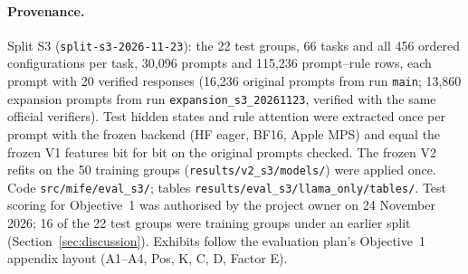 \documentclass{article}
\begin{document}
\paragraph{Provenance.} Split S3 (\texttt{split-s3-2026-11-23}): the 22 test groups, 66 tasks and all 456 ordered
configurations per task, 30,096 prompts and 115,236 prompt--rule rows, each prompt with 20 verified responses (16,236
original prompts from run \texttt{main}; 13,860 expansion prompts from run \texttt{expansion\_s3\_20261123}, verified
with the same official verifiers). Test hidden states and rule attention were extracted once per prompt with the frozen
backend (HF eager, BF16, Apple MPS) and equal the frozen V1 features bit for bit on the original prompts checked. The
frozen V2 refits on the 50 training groups (\texttt{results/v2\_s3/models/}) were applied once. Code
\texttt{src/mife/eval\_s3/}; tables \texttt{results/eval\_s3/llama\_only/tables/}. Test scoring for Objective~1 was
authorised by the project owner on 24 November 2026; 16 of the 22 test groups were training groups under an earlier
split (Section~\ref{sec:discussion}). Exhibits follow the evaluation plan's Objective~1 appendix layout (A1--A4, Pos,
K, C, D, Factor E).
\end{document}
